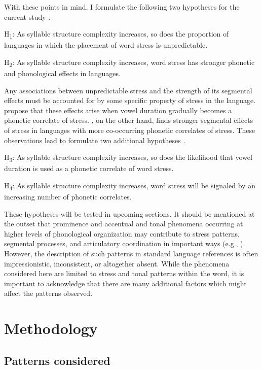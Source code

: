   With these points in mind, I formulate the following two hypotheses for the current study .

\ea\label{ex:5.4}
  H\textsubscript{1}: As syllable structure complexity increases, so does the proportion of languages in which the placement of word stress is unpredictable.
\z
  
\ea\label{ex:5.5}
  H\textsubscript{2}: As syllable structure complexity increases, word stress has stronger phonetic and phonological effects in languages.
\z

  Any associations between unpredictable stress and the strength of its segmental effects must be accounted for by some specific property of stress in the language. \citet{BybeeEtAl1998} propose that these effects arise when vowel duration gradually becomes a phonetic correlate of stress. \citet{Schiering2007}, on the other hand, finds stronger segmental effects of stress in languages with more co-occurring phonetic correlates of stress. These observations lead to formulate two additional hypotheses .

\ea\label{ex:5.6}
  H\textsubscript{3}: As syllable structure complexity increases, so does the likelihood that vowel duration is used as a phonetic correlate of word stress.
\z

\ea\label{ex:5.7}
  H\textsubscript{4}: As syllable structure complexity increases, word stress will be signaled by an increasing number of phonetic correlates.
\z

  These hypotheses will be tested in upcoming sections. It should be mentioned at the outset that prominence and accentual and tonal phenomena occurring at higher levels of phonological organization may contribute to stress patterns, segmental processes, and articulatory coordination in important ways (e.g., \citealt{FougeronKeating1997}). However, the description of such patterns in standard language references is often impressionistic, inconsistent, or altogether absent. While the phenomena considered here are limited to stress and tonal patterns within the word, it is important to acknowledge that there are many additional factors which might affect the patterns observed.

\section{Methodology}\label{sec:5.2}
\subsection{Patterns considered}\label{sec:5.2.1}

